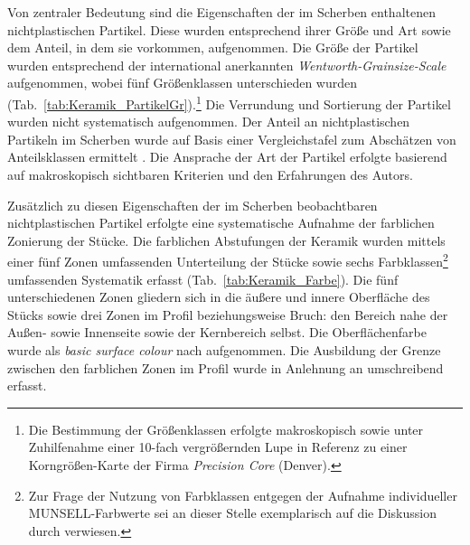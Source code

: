 \begin{multicols}{2}
\noindent Von zentraler Bedeutung sind die Eigenschaften der im Scherben enthaltenen nichtplastischen Partikel. Diese wurden entsprechend ihrer Größe und Art sowie dem Anteil, in dem sie vorkommen, aufgenommen. Die Größe der Partikel wurden entsprechend der international anerkannten \textit{Wentworth-Grainsize-Scale} \parencite[381 Tab.~1, 388 Abb.~3]{Wentworth.1922} aufgenommen, wobei fünf Größenklassen unterschieden wurden (Tab.~\ref{tab:Keramik_PartikelGr}).\footnote{Die Bestimmung der Größenklassen erfolgte makroskopisch sowie unter Zuhilfenahme einer 10-fach vergrößernden Lupe in Referenz zu einer Korngrößen-Karte der Firma \textit{Precision Core} (Denver).} Die Verrundung und Sortierung der Partikel wurden nicht systematisch aufgenommen. Der Anteil an nichtplastischen Partikeln im Scherben wurde auf Basis einer Vergleichstafel zum Abschätzen von Anteilsklassen ermittelt \parencites[32]{Kinne.2009}[nach][]{Hodgson.1976}. Die Ansprache der Art der Partikel erfolgte basierend auf makroskopisch sichtbaren Kriterien und den Erfahrungen des Autors.

Zusätzlich zu diesen Eigenschaften der im Scherben beobachtbaren nichtplastischen Partikel erfolgte eine systematische Aufnahme der farblichen Zonierung der Stücke. Die farblichen Abstufungen der Keramik wurden mittels einer fünf Zonen umfassenden Unterteilung der Stücke sowie sechs Farbklassen\footnote{Zur Frage der Nutzung von Farbklassen entgegen der Aufnahme individueller MUNSELL-Farbwerte sei an dieser Stelle exemplarisch auf die Diskussion durch \textcite[38]{Keding.1997} verwiesen.} umfassenden Systematik erfasst (Tab.~\ref{tab:Keramik_Farbe}). Die fünf unterschiedenen Zonen gliedern sich in die äußere und innere Oberfläche des Stücks sowie drei Zonen im Profil beziehungsweise Bruch: den Bereich nahe der Außen- sowie Innenseite sowie der Kernbereich selbst. Die Oberflächenfarbe wurde als \textit{basic surface colour} nach \textcite[44\,f.]{Nordstrom.1972} aufgenommen. Die Ausbildung der Grenze zwischen den farblichen Zonen im Profil wurde in Anlehnung an \textcite[27]{Kinne.2009} umschreibend erfasst.


\end{multicols}
